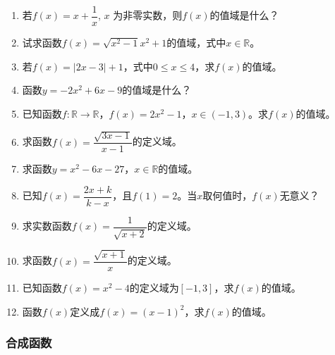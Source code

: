 \documentclass[UTF8]{ctexart}
\begin{document}
\begin{enumerate}
    \item 若$f(x) = x + \dfrac{1}{x}$, $x$ 为非零实数，则$f(x)$的值域是什么？
    \item 试求函数$f(x) = \sqrt{x^2 - 1}{x^2 + 1}$的值域，式中$x \in \mathbb{R}$。
    \item 若$f(x) = |2x - 3| + 1$，式中$0 \leq x \leq 4$，求$f(x)$的值域。
    \item 函数$y = -2x^2 + 6x - 9$的值域是什么？
    \item 已知函数$f: \mathbb{R} \to \mathbb{R}$，$f(x) = 2x^2 - 1$，$x \in (-1,3)$。求$f(x)$的值域。
    \item 求函数$f(x) = \dfrac{\sqrt{3x - 1}}{x - 1}$的定义域。
    \item 求函数$y = x^2 - 6x - 27$，$x \in \mathbb{R}$的值域。
    \item 已知$f(x) = \dfrac{2x + k}{k - x}$，且$f(1) = 2$。当$x$取何值时，$f(x)$无意义？
    \item 求实数函数$f(x) = \dfrac{1}{\sqrt{x+2}}$的定义域。
    \item 求函数$f(x) = \dfrac{\sqrt{x + 1}}{x}$的定义域。
    \item 已知函数$f(x) = x^2 - 4$的定义域为$[-1, 3]$，求$f(x)$的值域。
    \item 函数$f(x)$定义成$f(x) = (x - 1)^2$，求$f(x)$的值域。
\end{enumerate}

\subsubsection*{合成函数}
\end{document}
